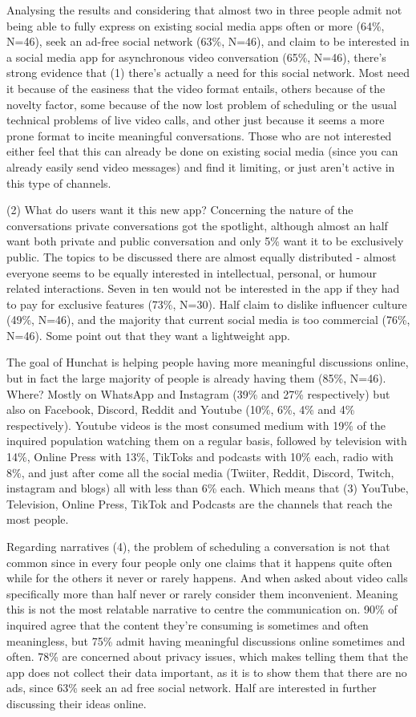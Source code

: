 \documentclass[12pt]{article}
\begin{document}
Analysing the results and considering that almost two in three people admit not being able to fully express on existing social media apps often or more (64\%, N=46), seek an ad-free social network (63\%, N=46), and claim to be interested in a social media app for asynchronous video conversation (65\%, N=46), there's strong evidence that (1) there's actually a need for this social network. Most need it because of the easiness that the video format entails, others because of the novelty factor, some because of the now lost problem of scheduling or the usual technical problems of live video calls, and other just because it seems a more prone format to incite meaningful conversations. Those who are not interested either feel that this can already be done on existing social media (since you can already easily send video messages) and find it limiting, or just aren't active in this type of channels.

(2) What do users want it this new app? Concerning the nature of the conversations private conversations got the spotlight, although almost an half want both private and public conversation and only 5\% want it to be exclusively public. The topics to be discussed there are almost equally distributed - almost everyone seems to be equally interested in intellectual, personal, or humour related interactions. Seven in ten would not be interested in the app if they had to pay for exclusive features (73\%, N=30). Half claim to dislike influencer culture (49\%, N=46), and the majority that current social media is too commercial (76\%, N=46). Some point out that they want a lightweight app.

The goal of Hunchat is helping people having more meaningful discussions online, but in fact the large majority of people is already having them (85\%, N=46). Where? Mostly on WhatsApp and Instagram (39\% and 27\% respectively) but also on Facebook, Discord, Reddit and Youtube (10\%, 6\%, 4\% and 4\% respectively). Youtube videos is the most consumed medium with 19\% of the inquired population watching them on a regular basis, followed by television with 14\%, Online Press with 13\%, TikToks and podcasts with 10\% each, radio with 8\%, and just after come all the social media (Twiiter, Reddit, Discord, Twitch, instagram and blogs) all with less than 6\% each. Which means that (3) YouTube, Television, Online Press, TikTok and Podcasts are the channels that reach the most people.

Regarding narratives (4), the problem of scheduling a conversation is not that common since in every four people only one claims that it happens quite often while for the others it never or rarely happens. And when asked about video calls specifically more than half never or rarely consider them inconvenient. Meaning this is not the most relatable narrative to centre the communication on. 90\% of inquired agree that the content they're consuming is sometimes and often meaningless, but 75\% admit having meaningful discussions online sometimes and often. 78\% are concerned about privacy issues, which makes telling them that the app does not collect their data important, as it is to show them that there are no ads, since 63\% seek an ad free social network. Half are interested in further discussing their ideas online. 
\end{document}
